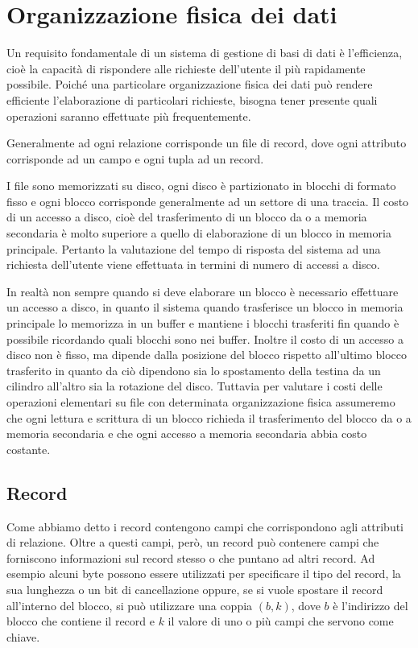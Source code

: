 \chapter{Organizzazione fisica dei dati}
Un requisito fondamentale di un sistema di gestione di basi di dati è l'efficienza, cioè la capacità di rispondere alle richieste dell'utente il più rapidamente possibile. Poiché una particolare organizzazione fisica dei dati può rendere efficiente l'elaborazione di particolari richieste, bisogna tener presente quali operazioni saranno effettuate più frequentemente.

Generalmente ad ogni relazione corrisponde un file di record, dove ogni attributo corrisponde ad un campo e ogni tupla ad un record.

I file sono memorizzati su disco, ogni disco è partizionato in blocchi di formato fisso e ogni blocco corrisponde generalmente ad un settore di una traccia. Il costo di un accesso a disco, cioè del trasferimento di un blocco da o a memoria secondaria è molto superiore a quello di elaborazione di un blocco in memoria principale. Pertanto la valutazione del tempo di risposta del sistema ad una richiesta dell'utente viene effettuata in termini di numero di accessi a disco.

In realtà non sempre quando si deve elaborare un blocco è necessario effettuare un accesso
a disco, in quanto il sistema quando trasferisce un blocco in memoria principale lo
memorizza in un buffer e mantiene i blocchi trasferiti fin quando è possibile ricordando quali blocchi sono nei buffer. Inoltre il costo di un accesso a disco non è fisso, ma dipende dalla posizione del blocco rispetto all'ultimo blocco trasferito in quanto da ciò dipendono sia lo spostamento della testina da un cilindro all'altro sia la rotazione del disco. Tuttavia per valutare i costi delle operazioni elementari su file con determinata organizzazione fisica assumeremo che ogni lettura e scrittura di un blocco richieda il trasferimento del blocco da o a memoria secondaria e che ogni accesso a memoria secondaria abbia costo costante.

\section{Record}
Come abbiamo detto i record contengono campi che corrispondono agli attributi di relazione. Oltre a questi campi, però, un record può contenere campi che forniscono informazioni sul record stesso o che puntano ad altri record. Ad esempio alcuni byte possono essere utilizzati per specificare il tipo del record, la sua lunghezza o un bit di cancellazione oppure, se si vuole spostare il record all'interno del blocco, si può utilizzare una coppia $(b,k)$, dove $b$ è l'indirizzo del blocco che contiene il record e $k$ il valore di uno o più campi che servono come chiave.

